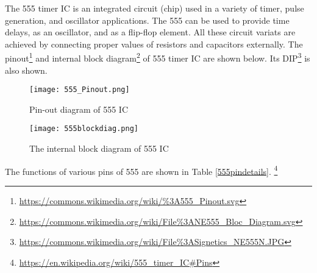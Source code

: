 The 555 timer IC is an integrated circuit (chip) used in a variety of timer, pulse generation, and oscillator applications. The 555 can be used to provide time delays, as an oscillator, and as a flip-flop element. All these circuit variats are achieved by connecting proper values of resistors and capacitors externally.
The pinout\footnote{\url{https://commons.wikimedia.org/wiki/\%3A555_Pinout.svg}} and internal block diagram\footnote{\url{https://commons.wikimedia.org/wiki/File\%3ANE555_Bloc_Diagram.svg}} of 555 timer IC are shown below.
Its DIP\footnote{\url{https://commons.wikimedia.org/wiki/File\%3ASignetics_NE555N.JPG}} is also shown.
\begin{figure}[h]
\texttt{[image: 555\_Pinout.png]}
\caption{Pin-out diagram of 555 IC}
\end{figure}


\begin{figure}[h]


\texttt{[image: 555blockdiag.png]}
\caption{The internal block diagram of 555 IC}

\end{figure}

The functions of various pins of 555 are shown in Table \ref{555pindetails}. \footnote{\url{https://en.wikipedia.org/wiki/555_timer_IC\#Pins}}

